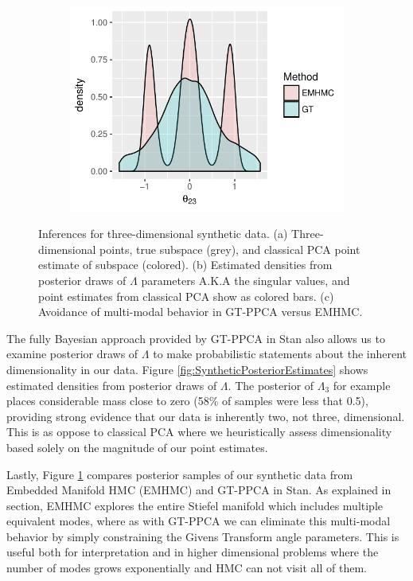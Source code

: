\documentclass{article}
\begin{document}
\begin{figure}
    ~ %
    \begin{subfigure}[b]{0.3\textwidth}
        \includegraphics[width=\textwidth]{multiModal.pdf}
        \caption{}
        \label{fig:multiModal}
    \end{subfigure}
    \caption{Inferences for three-dimensional synthetic data. (a) Three-dimensional points, true subspace (grey), and classical PCA point estimate of subspace (colored). (b) Estimated densities from posterior draws of $\Lambda$ parameters A.K.A  the singular values, and point estimates from classical PCA show as colored bars. (c) Avoidance of multi-modal behavior in GT-PPCA versus EMHMC.}\label{fig:synthetic}
\end{figure}

The fully Bayesian approach provided by GT-PPCA in Stan also allows us to examine posterior draws of $\Lambda$ to make probabilistic statements about the inherent dimensionality in our data. Figure \ref{fig:SyntheticPosteriorEstimates} shows estimated densities from posterior draws of $\Lambda$. The posterior of $\Lambda_3$ for example places considerable mass close to zero (58\% of samples were less that 0.5), providing strong evidence that our data is inherently two, not three, dimensional. This is as oppose to classical PCA where we heuristically assess dimensionality based solely on the magnitude of our point estimates.

Lastly, Figure \ref{fig:multiModal} compares posterior samples of our synthetic data from Embedded Manifold HMC (EMHMC) and GT-PPCA in Stan. As explained in section, EMHMC explores the entire Stiefel manifold which includes multiple equivalent modes, where as with GT-PPCA we can eliminate this multi-modal behavior by simply constraining the Givens Transform angle parameters. This is useful both for interpretation and in higher dimensional problems where the number of modes grows exponentially and HMC can not visit all of them. 
\end{document}
